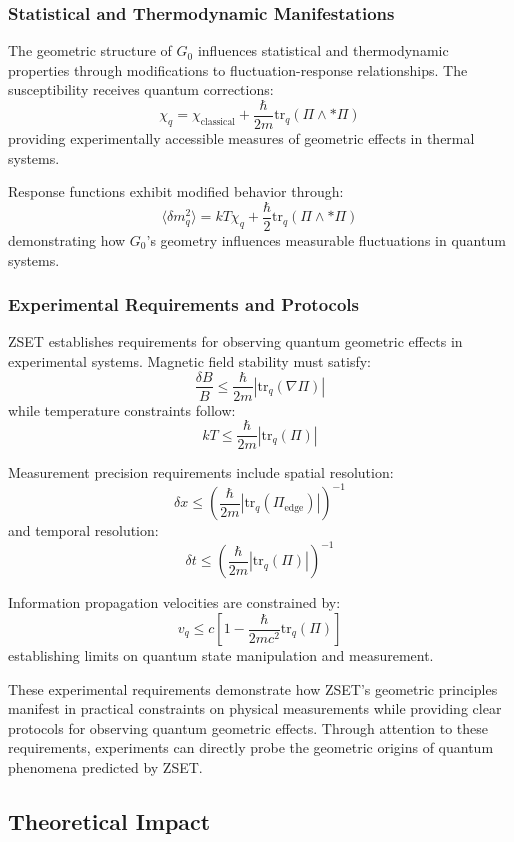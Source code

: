 \documentclass[10pt]{article}
\begin{document}
\subsubsection{Statistical and Thermodynamic Manifestations}

The geometric structure of \(G_0\) influences statistical and thermodynamic properties through modifications to fluctuation-response relationships. The susceptibility receives quantum corrections:
\[
\chi_q = \chi_\text{classical} + \frac{\hbar}{2m} \text{tr}_q (\Pi \wedge *\Pi)
\]
providing experimentally accessible measures of geometric effects in thermal systems.

Response functions exhibit modified behavior through:
\[
\langle \delta m_q^2 \rangle = kT \chi_q + \frac{\hbar}{2} \text{tr}_q (\Pi \wedge *\Pi)
\]
demonstrating how \(G_0\)'s geometry influences measurable fluctuations in quantum systems.

\subsubsection{Experimental Requirements and Protocols}

ZSET establishes requirements for observing quantum geometric effects in experimental systems. Magnetic field stability must satisfy:
\[
\frac{\delta B}{B} \leq \frac{\hbar}{2m} \left| \text{tr}_q (\nabla\Pi) \right|
\]
while temperature constraints follow:
\[
kT \leq \frac{\hbar}{2m} \left| \text{tr}_q (\Pi) \right|
\]

Measurement precision requirements include spatial resolution:
\[
\delta x \leq \left(\frac{\hbar}{2m}|\text{tr}_q(\Pi_\text{edge})|\right)^{-1}
\]
and temporal resolution:
\[
\delta t \leq \left(\frac{\hbar}{2m}|\text{tr}_q(\Pi)|\right)^{-1}
\]

Information propagation velocities are constrained by:
\[
v_q \leq c \left[ 1 - \frac{\hbar}{2mc^2} \text{tr}_q (\Pi) \right]
\]
establishing limits on quantum state manipulation and measurement.

These experimental requirements demonstrate how ZSET's geometric principles manifest in practical constraints on physical measurements while providing clear protocols for observing quantum geometric effects. Through attention to these requirements, experiments can directly probe the geometric origins of quantum phenomena predicted by ZSET.

\subsection{Theoretical Impact}
\end{document}
